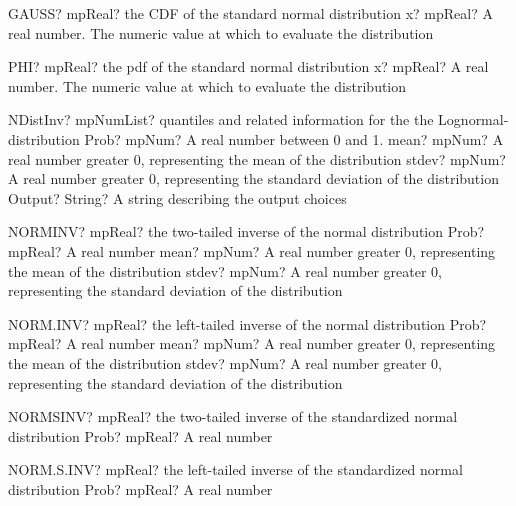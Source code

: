 \documentclass[12pt,a4paper,openany]{book}
\begin{document}
\begin{mpFunctionsExtract}
\mpWorksheetFunctionOneNotImplemented
{GAUSS? mpReal? the CDF of the  standard normal distribution}
{x? mpReal? A real number. The numeric value at which to evaluate the distribution}
\end{mpFunctionsExtract}

\begin{mpFunctionsExtract}
\mpWorksheetFunctionOneNotImplemented
{PHI? mpReal? the pdf of the  standard normal distribution}
{x? mpReal? A real number. The numeric value at which to evaluate the distribution}
\end{mpFunctionsExtract}

\begin{mpFunctionsExtract}
\mpFunctionFourNotImplemented
{NDistInv? mpNumList? quantiles and related information for the the Lognormal-distribution}
{Prob? mpNum? A real number between 0 and 1.}
{mean? mpNum? A real number greater 0, representing the mean of the distribution}
{stdev? mpNum? A real number greater 0, representing the standard deviation of the distribution}
{Output? String? A string describing the output choices}
\end{mpFunctionsExtract}

\begin{mpFunctionsExtract}
\mpWorksheetFunctionThreeNotImplemented
{NORMINV? mpReal? the two-tailed inverse of the normal distribution}
{Prob? mpReal? A real number}
{mean? mpNum? A real number greater 0, representing the mean of the distribution}
{stdev? mpNum? A real number greater 0, representing the standard deviation of the distribution}
\end{mpFunctionsExtract}

\begin{mpFunctionsExtract}
\mpWorksheetFunctionThreeNotImplemented
{NORM.INV? mpReal? the left-tailed inverse of the normal distribution}
{Prob? mpReal? A real number}
{mean? mpNum? A real number greater 0, representing the mean of the distribution}
{stdev? mpNum? A real number greater 0, representing the standard deviation of the distribution}
\end{mpFunctionsExtract}

\begin{mpFunctionsExtract}
\mpWorksheetFunctionOneNotImplemented
{NORMSINV? mpReal? the two-tailed inverse of the standardized normal distribution}
{Prob? mpReal? A real number}
\end{mpFunctionsExtract}

\begin{mpFunctionsExtract}
\mpWorksheetFunctionOneNotImplemented
{NORM.S.INV? mpReal? the left-tailed inverse of the standardized normal distribution}
{Prob? mpReal? A real number}
\end{mpFunctionsExtract}
\end{document}
